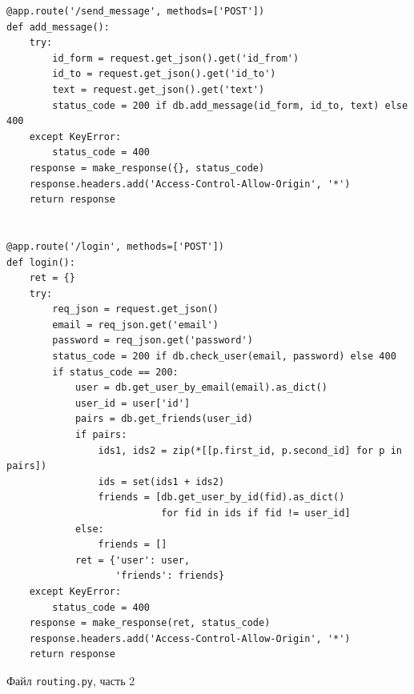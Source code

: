 \documentclass[14pt,final]{report}
\begin{document}
\begin{listing}[htbp]
\begin{center}
{\footnotesize
\begin{verbatim}
@app.route('/send_message', methods=['POST'])
def add_message():
    try:
        id_form = request.get_json().get('id_from')
        id_to = request.get_json().get('id_to')
        text = request.get_json().get('text')
        status_code = 200 if db.add_message(id_form, id_to, text) else 400
    except KeyError:
        status_code = 400
    response = make_response({}, status_code)
    response.headers.add('Access-Control-Allow-Origin', '*')
    return response


@app.route('/login', methods=['POST'])
def login():
    ret = {}
    try:
        req_json = request.get_json()
        email = req_json.get('email')
        password = req_json.get('password')
        status_code = 200 if db.check_user(email, password) else 400
        if status_code == 200:
            user = db.get_user_by_email(email).as_dict()
            user_id = user['id']
            pairs = db.get_friends(user_id)
            if pairs:
                ids1, ids2 = zip(*[[p.first_id, p.second_id] for p in pairs])
                ids = set(ids1 + ids2)
                friends = [db.get_user_by_id(fid).as_dict()
                           for fid in ids if fid != user_id]
            else:
                friends = []
            ret = {'user': user,
                   'friends': friends}
    except KeyError:
        status_code = 400
    response = make_response(ret, status_code)
    response.headers.add('Access-Control-Allow-Origin', '*')
    return response
\end{verbatim}}
\end{center}
\caption{Файл \texttt{routing.py}, часть 2}\label{lst:route2}
\end{listing}
\end{document}
